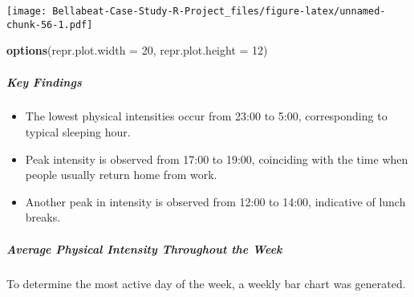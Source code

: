 \documentclass[
]{article}
\newenvironment{Shaded}{\begin{snugshade}}{\end{snugshade}}
\newcommand{\AttributeTok}[1]{\textcolor[rgb]{0.13,0.29,0.53}{#1}}
\newcommand{\DecValTok}[1]{\textcolor[rgb]{0.00,0.00,0.81}{#1}}
\newcommand{\FunctionTok}[1]{\textcolor[rgb]{0.13,0.29,0.53}{\textbf{#1}}}
\newcommand{\NormalTok}[1]{#1}
\providecommand{\tightlist}{%
  \setlength{\itemsep}{0pt}\setlength{\parskip}{0pt}}
\begin{document}
\texttt{[image: Bellabeat-Case-Study-R-Project\_files/figure-latex/unnamed-chunk-56-1.pdf]}

\begin{Shaded}
\begin{Highlighting}[]
\FunctionTok{options}\NormalTok{(}\AttributeTok{repr.plot.width =} \DecValTok{20}\NormalTok{, }\AttributeTok{repr.plot.height =} \DecValTok{12}\NormalTok{)}
\end{Highlighting}
\end{Shaded}

\hypertarget{key-findings-2}{%
\subparagraph{Key Findings}\label{key-findings-2}}

\begin{itemize}
\tightlist
\item
  The lowest physical intensities occur from 23:00 to 5:00,
  corresponding to typical sleeping hour.
\item
  Peak intensity is observed from 17:00 to 19:00, coinciding with the
  time when people usually return home from work.
\item
  Another peak in intensity is observed from 12:00 to 14:00, indicative
  of lunch breaks.
\end{itemize}

\hypertarget{average-physical-intensity-throughout-the-week}{%
\subparagraph{Average Physical Intensity Throughout the
Week}\label{average-physical-intensity-throughout-the-week}}

To determine the most active day of the week, a weekly bar chart was
generated.
\end{document}
